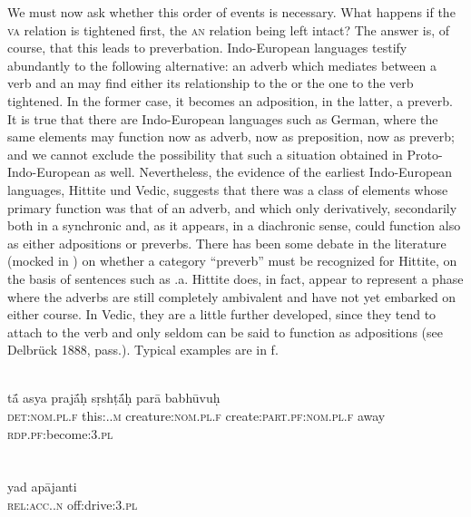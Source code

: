 We must now ask whether this order of events is necessary. What happens if the \textsc{va} relation is tightened first, the \textsc{an} relation being left intact? The answer is, of course, that this leads to preverbation. Indo-European languages testify abundantly to the following alternative: an adverb which mediates between a verb and an \np may find either its relationship to the \np or the one to the verb tightened. In the former case, it becomes an adposition, in the latter, a preverb. It is true that there are Indo-European languages such as German, where the same elements may function now as adverb, now as preposition, now as preverb; and we cannot exclude the possibility that such a situation obtained in Proto-Indo-European as well. Nevertheless, the evidence of the earliest Indo-European languages, Hittite und Vedic, suggests that there was a class of elements whose primary function was that of an adverb, and which only derivatively, secondarily both in a synchronic and, as it appears, in a diachronic sense, could function also as either adpositions or preverbs. There has been some debate in the literature (mocked in \citealt[127--131]{Starke1977}) on whether a category ``preverb'' must be recognized for Hittite, on the basis of sentences such as .a. Hittite does, in fact, appear to represent a phase where the adverbs are still completely ambivalent and have not yet embarked on either course.\label{page106} In Vedic, they are a little further developed, since they tend to attach to the verb and only seldom can be said to function as adpositions (see Delbrück 1888, pass.). Typical examples are in f.

\ea\label{ex:E78}
\\
\gll t{\'{\={a}}}  asya  praj{\'{\={a}}}ḥ  sṛshṭ{\'{\={a}}}ḥ par\=a  babh\=uvuḥ \\
 \textsc{det}:\textsc{nom}.\textsc{pl}.\textsc{f}  this:\glgen.\glsg.\textsc{m}  creature:\textsc{nom}.\textsc{pl}.\textsc{f}  create:\textsc{part}.\textsc{pf}:\textsc{nom}.\textsc{pl}.\textsc{f}  away  \textsc{rdp}.\textsc{pf}:become:3.\textsc{pl}  \\
\\
\z{}
\noindent \ea\label{ex:E79}
 \\
\gll yad  ap\=ajanti  \\
\textsc{rel}:\textsc{acc}.\glsg.\textsc{n}  off:drive:3.\textsc{pl}  \\
\\
\z 

